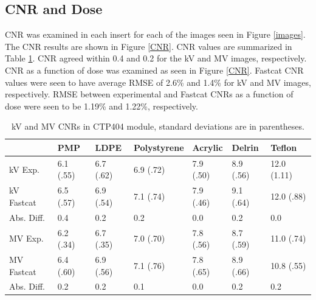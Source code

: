 \subsection{CNR and Dose}

CNR was examined in each insert for each of the images seen in Figure \ref{images}. The CNR results are shown in Figure \ref{CNR}. CNR values are summarized in Table \ref{tableCNR}. CNR agreed within 0.4 and 0.2 for the kV and MV images, respectively. CNR as a function of dose was examined as seen in Figure \ref{CNR}. Fastcat CNR values were seen to have average RMSE of 2.6\% and 1.4\% for kV and MV images, respectively. RMSE between experimental and Fastcat CNRs as a function of dose were seen to be 1.19\% and 1.22\%, respectively.

\begin{table}[h!]
\caption{kV and MV CNRs in CTP404 module, standard deviations are in parentheses.
}
\label{tableCNR}
\begin{center}
\begin{tabular}{|l|l|l|l|l|l|l|}
\hline
           & PMP       & LDPE      & Polystyrene & Acrylic   & Delrin    & Teflon      \\ \hline
kV Exp.    & 6.1 (.55) & 6.7 (.62) & 6.9 (.72)   & 7.9 (.50) & 8.9 (.56) & 12.0 (1.11) \\ \hline
kV Fastcat & 6.5 (.57) & 6.9 (.54) & 7.1 (.74)   & 7.9 (.46) & 9.1 (.64) & 12.0 (.88)  \\ \hline
Abs. Diff. & 0.4       & 0.2       & 0.2         & 0.0       & 0.2       & 0.0         \\ \hline
MV Exp.    & 6.2 (.34) & 6.7 (.35) & 7.0 (.70)   & 7.8 (.56) & 8.7 (.59) & 11.0 (.74)  \\ \hline
MV Fastcat & 6.4 (.60) & 6.9 (.56) & 7.1 (.76)   & 7.8 (.65) & 8.9 (.66) & 10.8 (.55)  \\ \hline
Abs. Diff. & 0.2       & 0.2       & 0.1         & 0.0       & 0.2       & 0.2         \\ \hline
\end{tabular}
\end{center}
\vspace{10mm}
\end{table}

